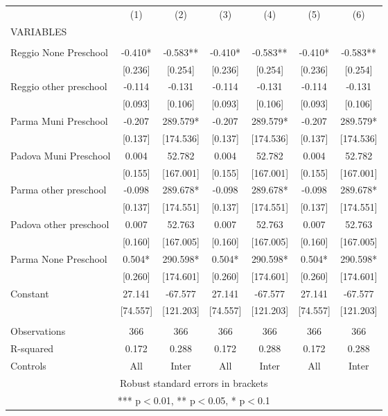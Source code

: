 \begin{tabular}{lcccccc} \hline
 & (1) & (2) & (3) & (4) & (5) & (6) \\
VARIABLES &  &  &  &  &  &  \\ \hline
 &  &  &  &  &  &  \\
Reggio None Preschool & -0.410* & -0.583** & -0.410* & -0.583** & -0.410* & -0.583** \\
 & [0.236] & [0.254] & [0.236] & [0.254] & [0.236] & [0.254] \\
Reggio other preschool & -0.114 & -0.131 & -0.114 & -0.131 & -0.114 & -0.131 \\
 & [0.093] & [0.106] & [0.093] & [0.106] & [0.093] & [0.106] \\
Parma Muni Preschool & -0.207 & 289.579* & -0.207 & 289.579* & -0.207 & 289.579* \\
 & [0.137] & [174.536] & [0.137] & [174.536] & [0.137] & [174.536] \\
Padova Muni Preschool & 0.004 & 52.782 & 0.004 & 52.782 & 0.004 & 52.782 \\
 & [0.155] & [167.001] & [0.155] & [167.001] & [0.155] & [167.001] \\
Parma other preschool & -0.098 & 289.678* & -0.098 & 289.678* & -0.098 & 289.678* \\
 & [0.137] & [174.551] & [0.137] & [174.551] & [0.137] & [174.551] \\
Padova other preschool & 0.007 & 52.763 & 0.007 & 52.763 & 0.007 & 52.763 \\
 & [0.160] & [167.005] & [0.160] & [167.005] & [0.160] & [167.005] \\
Parma None Preschool & 0.504* & 290.598* & 0.504* & 290.598* & 0.504* & 290.598* \\
 & [0.260] & [174.601] & [0.260] & [174.601] & [0.260] & [174.601] \\
Constant & 27.141 & -67.577 & 27.141 & -67.577 & 27.141 & -67.577 \\
 & [74.557] & [121.203] & [74.557] & [121.203] & [74.557] & [121.203] \\
 &  &  &  &  &  &  \\
Observations & 366 & 366 & 366 & 366 & 366 & 366 \\
R-squared & 0.172 & 0.288 & 0.172 & 0.288 & 0.172 & 0.288 \\
 Controls & All & Inter & All & Inter & All & Inter \\ \hline
\multicolumn{7}{c}{ Robust standard errors in brackets} \\
\multicolumn{7}{c}{ *** p$<$0.01, ** p$<$0.05, * p$<$0.1} \\
\end{tabular}
